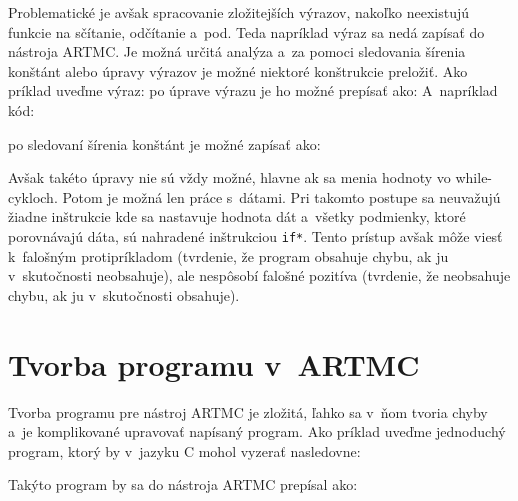 Problematické je avšak spracovanie zložitejších výrazov, nakoľko neexistujú funkcie na sčítanie, odčítanie a~pod. Teda napríklad výraz
sa nedá zapísať do nástroja ARTMC. Je možná určitá analýza a~za pomoci sledovania šírenia konštánt alebo úpravy výrazov je možné niektoré konštrukcie preložiť.
\newpage
\noindent
Ako príklad uveďme výraz:  po úprave výrazu je ho možné prepísať ako: 
A~napríklad kód:


\noindent
po sledovaní šírenia konštánt je možné zapísať ako:


Avšak takéto úpravy nie sú vždy možné, hlavne ak sa menia hodnoty vo while-cykloch. Potom je možná len  práce s~dátami. Pri takomto postupe sa neuvažujú žiadne inštrukcie kde sa nastavuje hodnota dát a~všetky podmienky, ktoré porovnávajú dáta, sú nahradené inštrukciou \texttt{if*}. Tento prístup avšak môže viesť k~falošným protipríkladom (tvrdenie, že program obsahuje chybu, ak ju v~skutočnosti neobsahuje), ale nespôsobí falošné pozitíva (tvrdenie, že neobsahuje chybu, ak ju v~skutočnosti obsahuje).

\section{Tvorba programu v~ARTMC}
Tvorba programu pre nástroj ARTMC je zložitá, ľahko sa v~ňom tvoria chyby a~je komplikované
upravovať napísaný program.
Ako príklad uveďme jednoduchý program, ktorý by v~jazyku C mohol vyzerať nasledovne:


\noindent
Takýto program by sa do nástroja ARTMC prepísal ako:


